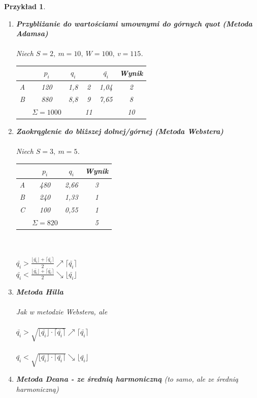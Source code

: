 \documentclass[12pt,a4paper]{article}
\theoremstyle{break}
\newtheorem{example}{Przykład}[section]
\begin{document}
\begin{example}
\begin{enumerate}[1)]
			\item \textbf{Przybliżanie do wartościami umownymi do górnych quot (Metoda Adamsa)}\\\\
			Niech $S=2,\: m= 10,\: W=100, \:v=115$.\\
			\begin{tabular}{|c|c|c|c|c|c|}
				\hline
				& $p_i$ & $q_i$ &  & $\bar{q_i}$ & Wynik \\
				\hline
				A & 120 & 1,8 & 2 & 1,04 & 2 \\
				B & 880 & 8,8 & 9 & 7,65 & 8 \\
				\hline
				& $\Sigma=1000$ & & 11 & & 10 \\
				\hline
			\end{tabular}
			
			\item \textbf{Zaokrąglenie do bliższej dolnej/górnej (Metoda Webstera)}\\\\
			Niech $S=3,\: m=5$.\\
			\begin{tabular}{|c|c|c|c|}
				\hline
				& $p_i$ & $q_i$ & Wynik \\
				\hline
				A & 480 & 2,66 & 3 \\
				B & 240 & 1,33 & 1 \\
				C & 100 & 0,55 & 1 \\
				\hline
				& $\Sigma=820$ & & 5 \\
				\hline
			\end{tabular}\\\\
			$\bar{q_i}>\frac{\lfloor \bar{q_i}\rfloor + \lceil \bar{q_i}\rceil}{2} \nearrow \lceil \bar{q_i} \rceil$ \\
			$\bar{q_i}<\frac{\lfloor \bar{q_i}\rfloor + \lceil \bar{q_i}\rceil}{2} \searrow \lfloor \bar{q_i} \rfloor$
			
			\item \textbf{Metoda Hilla}\\\\
			Jak w metodzie Webstera, ale\\\\
			$\bar{q_i} > \sqrt{\lfloor \bar{q_i} \rfloor \cdot \lceil \bar{q_i} \rceil} \nearrow \lceil \bar{q_i} \rceil$\\\\
			$\bar{q_i} < \sqrt{\lfloor \bar{q_i} \rfloor \cdot \lceil \bar{q_i} \rceil} \searrow \lfloor \bar{q_i} \rfloor$
			
			\item \textbf{Metoda Deana - ze średnią harmoniczną} (to samo, ale ze średnią harmoniczną)
		\end{enumerate}
	\end{example}
	
\end{document}
